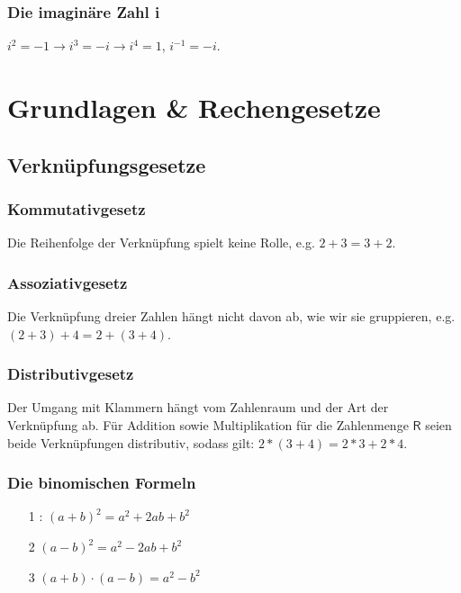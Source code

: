 \documentclass[letterpaper, titlepage]{article}
\begin{document}
\subsubsection{Die imaginäre Zahl i}\label{Die imaginäre Zahl}
$i^2=-1 \rightarrow i^3=-i \rightarrow i^4=1$, $i^{-1}=-i$.
\section{Grundlagen \& Rechengesetze}\label{Grundlegende Rechengesetze}
\subsection{Verknüpfungsgesetze}\label{Verknüpfungsgesetze}
\subsubsection{Kommutativgesetz}\label{Kommutativgesetz}
Die Reihenfolge der Verknüpfung spielt keine Rolle, e.g. $2+3=3+2$. 
\subsubsection{Assoziativgesetz}\label{Assoziativgesetz}
Die Verknüpfung dreier Zahlen hängt nicht davon ab, wie wir sie gruppieren, e.g. $(2 + 3) + 4 = 2 + (3 + 4)$. 
\subsubsection{Distributivgesetz}\label{Distributivgesetz}
Der Umgang mit Klammern hängt vom Zahlenraum und der Art der Verknüpfung ab. Für Addition sowie Multiplikation für die Zahlenmenge $\mathsf{R}$ seien beide Verknüpfungen distributiv, sodass gilt: $2*(3+4)=2*3+2*4$. \hfill \break
\subsubsection{Die binomischen Formeln}
\begin{enumerate}
    \item[1]: $(a+b)^2=a^2+2ab+b^2$
    \item[2] $(a-b)^2=a^2-2ab+b^2$
    \item[3]  $(a+b)\cdot(a-b)=a^2-b^2$
\end{enumerate}
\end{document}
